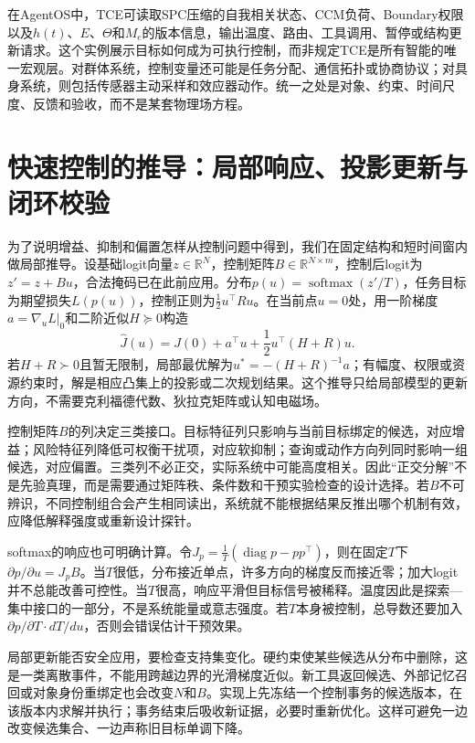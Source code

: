 在AgentOS中，TCE可读取SPC压缩的自我相关状态、CCM负荷、Boundary权限以及$h(t)$、$E$、$\Theta$和$M_e$的版本信息，输出温度、路由、工具调用、暂停或结构更新请求。这个实例展示目标如何成为可执行控制，而非规定TCE是所有智能的唯一宏观层。对群体系统，控制变量还可能是任务分配、通信拓扑或协商协议；对具身系统，则包括传感器主动采样和效应器动作。统一之处是对象、约束、时间尺度、反馈和验收，而不是某套物理场方程。

\section{快速控制的推导：局部响应、投影更新与闭环校验}
\label{sec:tce_fast_loop_derivation}

为了说明增益、抑制和偏置怎样从控制问题中得到，我们在固定结构和短时间窗内做局部推导。设基础logit向量$z\in\mathbb{R}^{N}$，控制矩阵$B\in\mathbb{R}^{N\times m}$，控制后logit为$z'=z+Bu$，合法掩码已在此前应用。分布$p(u)=\operatorname{softmax}(z'/T)$，任务目标为期望损失$L(p(u))$，控制正则为$\frac12u^{\top}Ru$。在当前点$u=0$处，用一阶梯度$a=\nabla_uL\vert_0$和二阶近似$H\succeq0$构造
\[
\widehat J(u)=J(0)+a^{\top}u+\frac12u^{\top}(H+R)u .
\]
若$H+R\succ0$且暂无限制，局部最优解为$u^*=-(H+R)^{-1}a$；有幅度、权限或资源约束时，解是相应凸集上的投影或二次规划结果。这个推导只给局部模型的更新方向，不需要克利福德代数、狄拉克矩阵或认知电磁场。

控制矩阵$B$的列决定三类接口。目标特征列只影响与当前目标绑定的候选，对应增益；风险特征列降低可权衡干扰项，对应软抑制；查询或动作方向列同时影响一组候选，对应偏置。三类列不必正交，实际系统中可能高度相关。因此“正交分解”不是先验真理，而是需要通过矩阵秩、条件数和干预实验检查的设计选择。若$B$不可辨识，不同控制组合会产生相同读出，系统就不能根据结果反推出哪个机制有效，应降低解释强度或重新设计探针。

softmax的响应也可明确计算。令$J_p=\frac{1}{T}(\operatorname{diag}p-pp^{\top})$，则在固定$T$下$\partial p/\partial u=J_pB$。当$T$很低，分布接近单点，许多方向的梯度反而接近零；加大logit并不总能改善可控性。当$T$很高，响应平滑但目标信号被稀释。温度因此是探索—集中接口的一部分，不是系统能量或意志强度。若$T$本身被控制，总导数还要加入$\partial p/\partial T\cdot dT/du$，否则会错误估计干预效果。

局部更新能否安全应用，要检查支持集变化。硬约束使某些候选从分布中删除，这是一类离散事件，不能用跨越边界的光滑梯度近似。新工具返回候选、外部记忆召回或对象身份重绑定也会改变$N$和$B$。实现上先冻结一个控制事务的候选版本，在该版本内求解并执行；事务结束后吸收新证据，必要时重新优化。这样可避免一边改变候选集合、一边声称旧目标单调下降。

